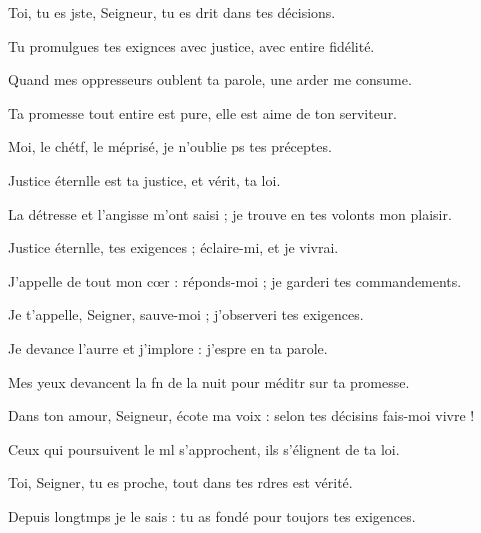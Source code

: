 \item Toi, tu es jste, Seigneur,\psstar{} tu es drit dans tes décisions.
\item Tu promulgues tes exignces avec justice,\psstar{} avec entire fidélité.
\item Quand mes oppresseurs oublent ta parole,\psstar{} une arder me consume.
\item Ta promesse tout entire est pure,\psstar{} elle est aime de ton serviteur.
\item Moi, le chétf, le méprisé,\psstar{} je n’oublie ps tes préceptes.
\item Justice éternlle est ta justice,\psstar{} et vérit, ta loi.
\item La détresse et l’angisse m’ont saisi ;\psstar{} je trouve en tes volonts mon plaisir.
\item Justice éternlle, tes exigences ;\psstar{} éclaire-mi, et je vivrai.
\item J’appelle de tout mon cœr : réponds-moi ;\psstar{} je garderi tes commandements.
\item Je t’appelle, Seigner, sauve-moi ;\psstar{} j’observeri tes exigences.
\item Je devance l’aurre et j’implore :\psstar{} j’espre en ta parole.
\item Mes yeux devancent la fn de la nuit\psstar{} pour méditr sur ta promesse.
\item Dans ton amour, Seigneur, écote ma voix :\psstar{} selon tes décisins fais-moi vivre !
\item Ceux qui poursuivent le ml s’approchent,\psstar{} ils s’élignent de ta loi.
\item Toi, Seigner, tu es proche,\psstar{} tout dans tes rdres est vérité.
\item Depuis longtmps je le sais :\psstar{} tu as fondé pour toujors tes exigences.